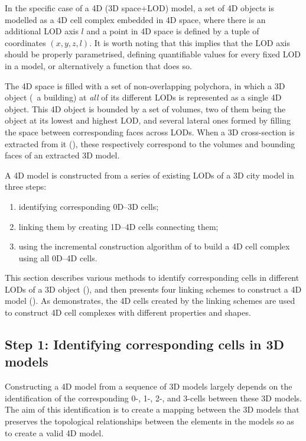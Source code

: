 In the specific case of a 4D (3D space+LOD) model, a set of 4D objects is modelled as a 4D cell complex embedded in 4D space, where there is an additional LOD axis $l$ and a point in 4D space is defined by a tuple of coordinates $(x,y,z,l)$.
It is worth noting that this implies that the LOD axis should be properly parametrised, defining quantifiable values for every fixed LOD in a model, or alternatively a function that does so.

The 4D space is filled with a set of non-overlapping polychora, in which a 3D object (\eg\ a building) at \emph{all} of its different LODs is represented as a single 4D object.
This 4D object is bounded by a set of volumes, two of them being the object at its lowest and highest LOD, and several lateral ones formed by filling the space between corresponding faces across LODs.
When a 3D cross-section is extracted from it (), these respectively correspond to the volumes and bounding faces of an extracted 3D model.

A 4D model is constructed from a series of existing LODs of a 3D city model in three steps: 
\begin{enumerate}
  \item identifying corresponding 0D--3D cells;
  \item linking them by creating 1D--4D cells connecting them;
  \item using the incremental construction algorithm of  to build a 4D cell complex using all 0D--4D cells.
\end{enumerate}

This section describes various methods to identify corresponding cells in different LODs of a 3D object (), and then presents four linking schemes to construct a 4D model ().
As  demonstrates, the 4D cells created by the linking schemes are used to construct 4D cell complexes with different properties and shapes.

\subsection{Step 1: Identifying corresponding cells in 3D models}
\label{ss:identification}

Constructing a 4D model from a sequence of 3D models largely depends on the identification of the corresponding 0-, 1-, 2-, and 3-cells between these 3D models.
The aim of this identification is to create a mapping between the 3D models that preserves the topological relationships between the elements in the models so as to create a valid 4D model.

